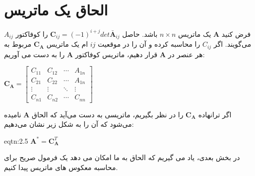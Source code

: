 \section{\textbf{الحاق یک ماتریس}}
\label{sec:2.6}
{
    \Large
    \begin{spacing}{1.5}
        فرض کنید $\textbf{A}$ یک ماتریس $n\times n$ باشد. حاصل $\textbf{C}_{ij}=(-1)^{i+j}det\bar{\textbf{A}}_{ij}$ را کوفاکتور $A_{ij}$ می‌گویند.
        اگر $C_{ij}$ را محاسبه کرده و آن را در موقعیت $ij$ ام یک ماتریس $\textbf{C}_{\textbf{A}}$ مربوط به هر عنصر در $\textbf{A}$ قرار دهیم، ماتریس کوفاکتور $\textbf{A}$ را به دست می آوریم:

        \begin{center}
            $\textbf{C}_{\textbf{A}}=\begin{bmatrix}
                                         C_{11} & C_{12} & \cdots & A_{1n} \\
                                         C_{21} & C_{22} & \cdots & A_{1n} \\
                                         \vdots & \vdots & \ddots & \vdots \\
                                         C_{n1} & C_{n2} & \cdots & C_{nn}
            \end{bmatrix}$
        \end{center}

        اگر ترانهاده $\textbf{C}_{\textbf{A}}$ را در نظر بگیریم، ماتریسی به دست می‌آید که الحاق $\textbf{A}$ نامیده می‌شود که آن را به شکل زیر نشان می‌دهیم:

        \begin{eqtn}{eqtn:2.5}
            \centering
            $\textbf{A}^{*}=\textbf{C}^{T}_{\textbf{A}}$
        \end{eqtn}

        در بخش بعدی، یاد می گیریم که الحاق به ما امکان می دهد یک فرمول صریح برای محاسبه معکوس های ماتریس پیدا کنیم.
    \end{spacing}
}


